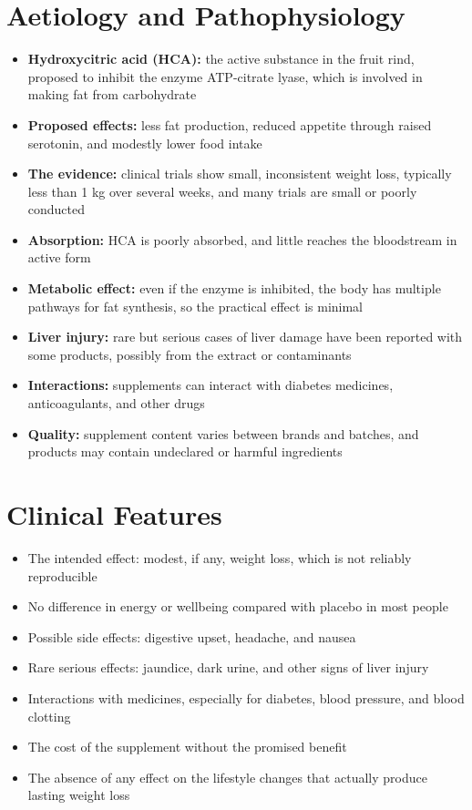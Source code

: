 \section*{Aetiology and Pathophysiology}
\begin{itemize}
    \item \textbf{Hydroxycitric acid (HCA):} the active substance in the fruit rind, proposed to inhibit the enzyme ATP-citrate lyase, which is involved in making fat from carbohydrate
    \item \textbf{Proposed effects:} less fat production, reduced appetite through raised serotonin, and modestly lower food intake
    \item \textbf{The evidence:} clinical trials show small, inconsistent weight loss, typically less than 1 kg over several weeks, and many trials are small or poorly conducted
    \item \textbf{Absorption:} HCA is poorly absorbed, and little reaches the bloodstream in active form
    \item \textbf{Metabolic effect:} even if the enzyme is inhibited, the body has multiple pathways for fat synthesis, so the practical effect is minimal
    \item \textbf{Liver injury:} rare but serious cases of liver damage have been reported with some products, possibly from the extract or contaminants
    \item \textbf{Interactions:} supplements can interact with diabetes medicines, anticoagulants, and other drugs
    \item \textbf{Quality:} supplement content varies between brands and batches, and products may contain undeclared or harmful ingredients
\end{itemize}

\section*{Clinical Features}
\begin{itemize}
    \item The intended effect: modest, if any, weight loss, which is not reliably reproducible
    \item No difference in energy or wellbeing compared with placebo in most people
    \item Possible side effects: digestive upset, headache, and nausea
    \item Rare serious effects: jaundice, dark urine, and other signs of liver injury
    \item Interactions with medicines, especially for diabetes, blood pressure, and blood clotting
    \item The cost of the supplement without the promised benefit
    \item The absence of any effect on the lifestyle changes that actually produce lasting weight loss
\end{itemize}

